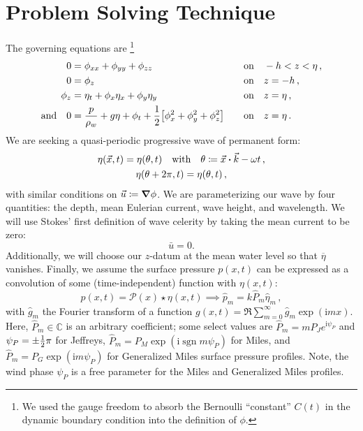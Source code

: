 \documentclass{jfm}
\newcommand{\GenP}{\hat{P}_m}
\DeclareMathOperator{\sgn}{sgn}
\newcommand{\im}{\mathrm{i}}
\begin{document}
\section{Problem Solving Technique}
The governing equations are%
\footnote{
  We used the gauge freedom to absorb the Bernoulli ``constant'' $C(t)$
  in the dynamic boundary condition into the definition of $\phi$.
}
\begin{alignat}{2}
  0 &= \phi_{xx} + \phi_{yy} + \phi_{zz} &&\qq{on}
  -h < z < \eta \,, \label{eq:laplace}\\
  0 &= \phi_{z} &&\qq{on} z=-h \,, \label{eq:bottom_bc}\\
  \phi_{z} &= \eta_{t} + \phi_{x} \eta_{x} +
  \phi_{y} \eta_{y} &&\qq{on} z = \eta \,, \label{eq:kinematic_bc}\\
  \qq*{and} 0 &= \frac{p}{\rho_w} + g\eta + \phi_{t} +
  \frac{1}{2} \bqty{\phi_{x}^2 + \phi_{y}^2 + \phi_{z}^2} &&\qq{on} z=
  \eta \,. \label{eq:dynamic_bc}
\end{alignat}
We are seeking a quasi-periodic progressive wave of permanent form:
\begin{gather}
  \eta(\vec{x},t) = \eta(\theta, t) \qq{with} \theta \coloneqq
  \vec{x}\vdot\vec{k} - \omega t \,, \\
  \eta(\theta + 2\pi,t) = \eta(\theta,t) \,,
  \label{eq:periodicity_condition}
\end{gather}
with similar conditions on $\vec{u} \coloneqq \grad{\phi}$.
We are parameterizing our wave by four quantities: the depth, mean
Eulerian current, wave height, and wavelength.
We will use Stokes' first definition of wave celerity by taking the mean
current to be zero:
\begin{equation}
  \bar{u} = 0. \label{eq:celerity_definition}
\end{equation}
Additionally, we will choose our $z$-datum at the mean water level so that
$\overline{\eta}$ vanishes.
Finally, we assume the surface pressure $p(x,t)$ can be expressed as a
convolution of some (time-independent) function with $\eta(x,t)$:
\begin{equation}
  p(x,t) = \mathcal{P}(x) \star \eta(x,t) \implies \hat{p}_m = k \GenP
    \hat{\eta}_m \,,
\end{equation}
with $\hat{g}_m$ the Fourier transform of a function $g(x,t) =
\Re{\sum_{m=0}^{\infty} \hat{g}_m \exp(\im m x)}$.
Here, $\GenP \in \mathbb{C}$ is an arbitrary coefficient; some select
values are
$\GenP = m P_J e^{\im \psi_P}$ and $\psi_P = \pm {\textstyle\frac{1}{2}} \pi$
for Jeffreys, $\GenP = P_M \exp(\im \sgn{m} \psi_P)$ for Miles, and
$\GenP = P_G \exp(\im m \psi_P)$ for Generalized Miles surface pressure
profiles.
Note, the wind phase $\psi_P$ is a free parameter for the Miles and
Generalized Miles profiles.
\end{document}

